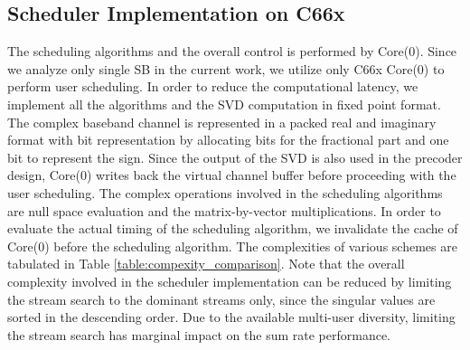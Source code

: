\documentclass[conference,letterpaper]{./../../IEEE/IEEEtran}
\begin{document}
\subsection{Scheduler Implementation on C66x}
The scheduling algorithms and the overall control is performed by Core(0). Since we analyze only single SB in the current work, we utilize only C66x Core(0) to perform user scheduling. In order to reduce the computational latency, we implement all the algorithms and the SVD computation in fixed point format. The complex baseband channel is represented in a packed real and imaginary format with  bit representation by allocating  bits for the fractional part and one bit to represent the sign. Since the output of the SVD is also used in the precoder design, Core(0) writes back the virtual channel buffer before proceeding with the user scheduling. The complex operations involved in the scheduling algorithms are null space evaluation and the matrix-by-vector multiplications. In order to evaluate the actual timing of the scheduling algorithm, we invalidate the cache of Core(0) before the scheduling algorithm. The complexities of various schemes are tabulated in Table \ref{table:compexity_comparison}. Note that the overall complexity involved in the scheduler implementation can be reduced by limiting the stream search to the dominant streams only, since the singular values are sorted in the descending order. Due to the available multi-user diversity, limiting the stream search has marginal impact on the sum rate performance. 
\end{document}
